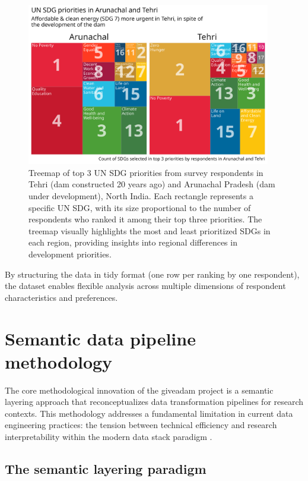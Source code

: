 \documentclass{article}
\begin{document}
\begin{figure}[ht]
  \centering
  \includegraphics[width=0.95\textwidth]{../figures_and_tables/top3-treemap.png}
  \caption{\label{fig:top3-treemap} Treemap of top 3 UN SDG priorities from survey respondents in Tehri (dam constructed 20 years ago) and Arunachal Pradesh (dam under development), North India. Each rectangle represents a specific UN SDG, with its size proportional to the number of respondents who ranked it among their top three priorities. The treemap visually highlights the most and least prioritized SDGs in each region, providing insights into regional differences in development priorities.}
\end{figure}

By structuring the data in tidy format (one row per ranking by one respondent), the dataset enables flexible analysis across multiple dimensions of respondent characteristics and preferences. 

\section{Semantic data pipeline methodology}
\label{sec:semantic-methodology}

The core methodological innovation of the giveadam project is a semantic layering approach that reconceptualizes data transformation pipelines for research contexts. This methodology addresses a fundamental limitation in current data engineering practices: the tension between technical efficiency and research interpretability within the modern data stack paradigm \cite{modern_data_stack_airbyte}.

\subsection{The semantic layering paradigm}
\label{subsec:semantic-paradigm}
\end{document}
